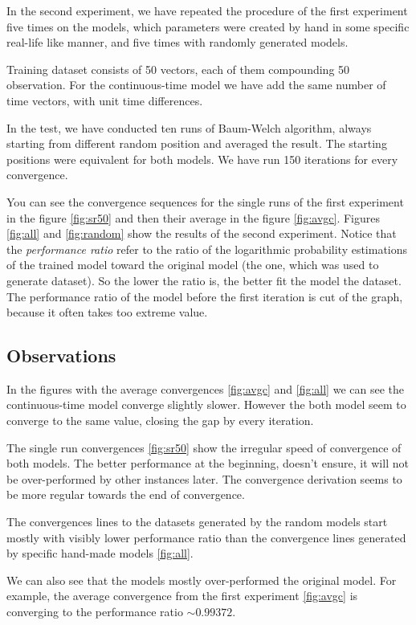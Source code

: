 \documentclass[thesis=M,english]{FITthesis}[2012/10/20]
\begin{document}
In the second experiment, we have repeated the procedure of the first experiment five times on the models, which parameters were created by hand in some specific real-life like manner, and five times with randomly generated models. 

Training dataset consists of 50 vectors, each of them compounding 50 observation. For the continuous-time model we have add the same number of time vectors, with unit time differences.

In the test, we have conducted ten runs of Baum-Welch algorithm, always starting from different random position and averaged the result. The starting positions were equivalent for both models. We have run 150 iterations for every convergence.

You can see the convergence sequences for the single runs of the first experiment in the figure \ref{fig:sr50} and then their average in the figure \ref{fig:avgc}. Figures \ref{fig:all} and \ref{fig:random} show the results of the second experiment. Notice that the \textit{performance ratio} refer to the ratio of the logarithmic probability estimations of the trained model toward the original model (the one, which was used to generate dataset). So the lower the ratio is, the better fit the model the dataset. The performance ratio of the model before the first iteration is cut of the graph, because it often takes too extreme value.

\subsection{ Observations }

In the figures with the average convergences \ref{fig:avgc} and \ref{fig:all} we can see the continuous-time model converge slightly slower. However the both model seem to converge to the same value, closing the gap by every iteration.
 
The single run convergences \ref{fig:sr50} show the irregular speed of convergence of both models. The better performance at the beginning, doesn't ensure, it will not be over-performed by other instances later. The convergence derivation seems to be more regular towards the end of convergence.

The convergences lines to the datasets generated by the random models start mostly with visibly lower performance ratio than the convergence lines generated by specific hand-made models \ref{fig:all}. 

We can also see that the models mostly over-performed the original model. For example, the average convergence from the first experiment \ref{fig:avgc} is converging to the performance ratio $\sim 0.99372$.  
\end{document}
